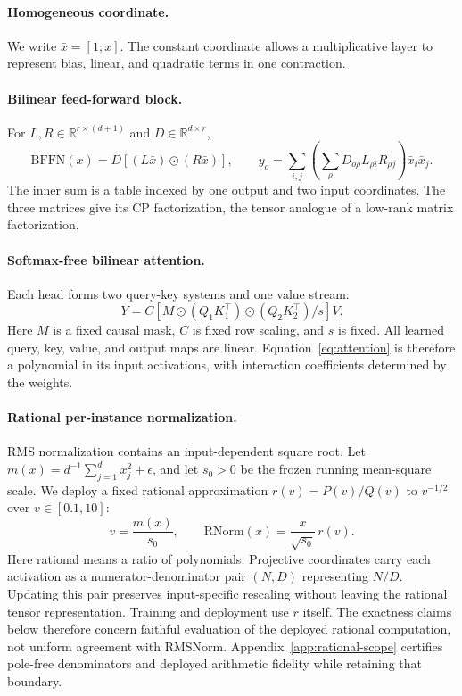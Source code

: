 \documentclass{article}
\newcommand{\R}{\mathbb{R}}
\begin{document}
\paragraph{Homogeneous coordinate.}
We write $\bar x=[1;x]$. The constant coordinate allows a multiplicative layer to represent
bias, linear, and quadratic terms in one contraction.

\paragraph{Bilinear feed-forward block.}
For $L,R\in\R^{r\times(d+1)}$ and $D\in\R^{d\times r}$,
\begin{equation}
\mathrm{BFFN}(x)
=D\left[(L\bar x)\odot(R\bar x)\right],
\qquad
y_o=\sum_{i,j}\left(\sum_{\rho}D_{o\rho}L_{\rho i}R_{\rho j}\right)\bar x_i\bar x_j .
\label{eq:bffn}
\end{equation}
The inner sum is a table indexed by one output and two input coordinates. The three matrices
give its CP factorization, the tensor analogue of a low-rank matrix factorization.

\paragraph{Softmax-free bilinear attention.}
Each head forms two query-key systems and one value stream:
\begin{equation}
Y=C\left[M\odot(Q_1K_1^\top)\odot(Q_2K_2^\top)/s\right]V .
\label{eq:attention}
\end{equation}
Here $M$ is a fixed causal mask, $C$ is fixed row scaling, and $s$ is fixed. All learned
query, key, value, and output maps are linear. Equation~\ref{eq:attention} is therefore a
polynomial in its input activations, with interaction coefficients determined by the weights.

\paragraph{Rational per-instance normalization.}
RMS normalization contains an input-dependent square root. Let
$m(x)=d^{-1}\sum_{j=1}^{d}x_j^2+\epsilon$, and let $s_0>0$ be the frozen running mean-square
scale. We deploy a fixed rational approximation $r(v)=P(v)/Q(v)$ to $v^{-1/2}$ over
$v\in[0.1,10]$:
\begin{equation}
v=\frac{m(x)}{s_0}, \qquad
\mathrm{RNorm}(x)=\frac{x}{\sqrt{s_0}}\,r(v).
\label{eq:rnorm}
\end{equation}
Here rational means a ratio of polynomials. Projective coordinates carry each activation as a
numerator-denominator pair $(N,D)$ representing $N/D$. Updating this pair preserves
input-specific rescaling without leaving the rational tensor representation.
Training and deployment use $r$ itself. The exactness claims below therefore concern faithful
evaluation of the deployed rational computation, not uniform agreement with RMSNorm.
Appendix~\ref{app:rational-scope} certifies pole-free denominators and deployed arithmetic
fidelity while retaining that boundary.
\end{document}
